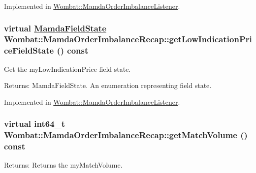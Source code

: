 Implemented in \hyperlink{classWombat_1_1MamdaOrderImbalanceListener_d52ff9594f69255d8ac514ffa8eabc84}{Wombat::Mamda\-Order\-Imbalance\-Listener}.\hypertarget{classWombat_1_1MamdaOrderImbalanceRecap_7e2c182069b4e4ec378447998ee72819}{
\subsubsection[getLowIndicationPriceFieldState]{\setlength{\rightskip}{0pt plus 5cm}virtual \hyperlink{namespaceWombat_93aac974f2ab713554fd12a1fa3b7d2a}{Mamda\-Field\-State} Wombat::Mamda\-Order\-Imbalance\-Recap::get\-Low\-Indication\-Price\-Field\-State () const}}
\label{classWombat_1_1MamdaOrderImbalanceRecap_7e2c182069b4e4ec378447998ee72819}


Get the my\-Low\-Indication\-Price field state. 

\begin{Desc}
\item[Returns:]Mamda\-Field\-State. An enumeration representing field state. \end{Desc}


Implemented in \hyperlink{classWombat_1_1MamdaOrderImbalanceListener_e6c44322841ce2147abacb25a5cf8fae}{Wombat::Mamda\-Order\-Imbalance\-Listener}.\hypertarget{classWombat_1_1MamdaOrderImbalanceRecap_2d983f66653cb0ca55dc88093794d850}{
\subsubsection[getMatchVolume]{\setlength{\rightskip}{0pt plus 5cm}virtual int64\_\-t Wombat::Mamda\-Order\-Imbalance\-Recap::get\-Match\-Volume () const}}
\label{classWombat_1_1MamdaOrderImbalanceRecap_2d983f66653cb0ca55dc88093794d850}


\begin{Desc}
\item[Returns:]Returns the my\-Match\-Volume. \end{Desc}


